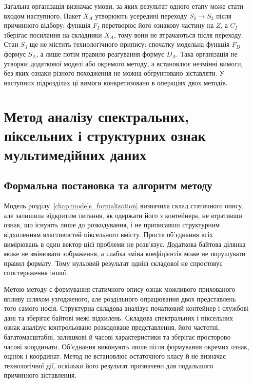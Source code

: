 Загальна організація визначає умови, за яких результат одного етапу може стати входом наступного. Пакет $X_A$ утворюють усередині переходу $S_2\rightarrow S_3$ після причинного відбору; функція $F_I$ перетворює його ознакову частину на $Z$, а $C_I$ зберігає посилання на складники $X_A$, тому вони не втрачаються після переходу. Стан $S_3$ ще не містить технологічного припису: спочатку модельна функція $F_D$ формує $S_A$, а лише потім правило реагування формує $D_A$. Така організація не утворює додаткової моделі або окремого методу, а встановлює незмінні вимоги, без яких ознаки різного походження не можна обґрунтовано зіставляти. У наступних підрозділах ці вимоги конкретизовано в операціях двох методів.

\section{Метод аналізу спектральних, піксельних і структурних ознак мультимедійних даних}
\label{sec:svs_method}

\subsection{Формальна постановка та алгоритм методу}

Модель розділу~\ref{chap:models_formalization} визначила склад статичного опису, але залишила відкритим питання, як одержати його з контейнера, не втративши ознак, що існують лише до розкодування, і не приписавши структурним відхиленням властивостей піксельного вмісту. Просте об’єднання всіх вимірювань в один вектор цієї проблеми не розв’язує. Додаткова байтова ділянка може не змінювати зображення, а слабка зміна коефіцієнтів може не порушувати правил формату. Тому нульовий результат однієї складової не спростовує спостереження іншої.

Метою методу є формування статичного опису ознак можливого прихованого впливу шляхом узгодженого, але роздільного опрацювання двох представлень того самого носія. Структурна складова аналізує початковий контейнер і службові дані та зберігає байтові межі відхилень. Складова спектральних і піксельних ознак аналізує контрольовано розкодоване представлення, його частотні, багатомасштабні, залишкові й часові характеристики та зберігає просторово-часові координати. Об’єднання виконують лише після формування окремих ознак, оцінок і координат. Метод не встановлює остаточного класу й не визначає технологічної дії, оскільки його результат призначено для подальшого причинного зіставлення.

